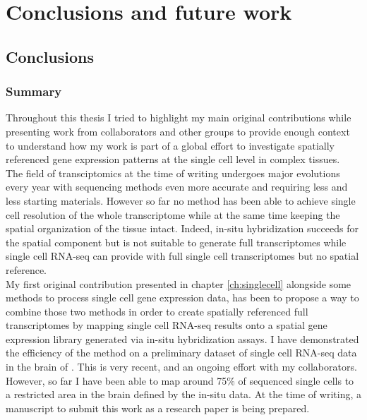 \chapter{Conclusions and future work}\label{ch:conclusions}

\section{Conclusions}

	\subsection{Summary}
	
Throughout this thesis I tried to highlight my main original contributions while presenting work from collaborators and other groups to provide enough context to understand how my work is part of a global effort to investigate spatially referenced gene expression patterns at the single cell level in complex tissues.\\

The field of transciptomics at the time of writing undergoes major evolutions every year with sequencing methods even more accurate and requiring less and less starting materials. However so far no method has been able to achieve single cell resolution of the whole transcriptome while at the same time keeping the spatial organization of the tissue intact. Indeed, in-situ hybridization succeeds for the spatial component but is not suitable to generate full transcriptomes while single cell RNA-seq can provide with full single cell transcriptomes but no spatial reference.\\

My first original contribution presented in chapter \ref{ch:singlecell} alongside some methods to process single cell gene expression data, has been to propose a way to combine those two methods in order to create spatially referenced full transcriptomes by mapping single cell RNA-seq results onto a spatial gene expression library generated via in-situ hybridization assays. I have demonstrated the efficiency of the method on a preliminary dataset of single cell RNA-seq data in the brain of \platy{}. This is very recent, and an ongoing effort with my collaborators. However, so far I have been able to map around 75\% of sequenced single cells to a restricted area in the brain defined by the in-situ data. At the time of writing, a manuscript to submit this work as a research paper is being prepared.\\

